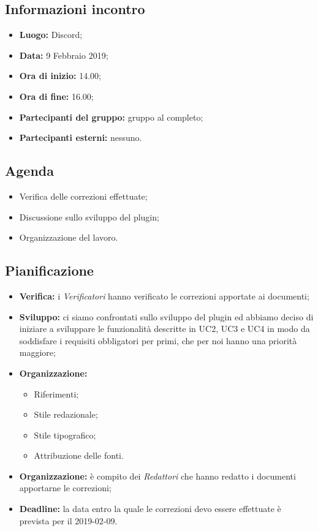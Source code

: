 \subsection{Informazioni incontro}
\begin{itemize}
	\item { \textbf{Luogo:} Discord};
	\item { \textbf{Data:} 9 Febbraio 2019};
	\item { \textbf{Ora di inizio:} 14.00};
	\item { \textbf{Ora di fine:} 16.00};
	\item { \textbf{Partecipanti del gruppo:} gruppo al completo};
	\item { \textbf{Partecipanti esterni:} nessuno}.
\end{itemize}


\subsection{Agenda}
\begin{itemize}
	\item {Verifica delle correzioni effettuate;}
	\item {Discussione sullo sviluppo del plugin;}
	\item {Organizzazione del lavoro.}
\end{itemize}

\subsection{Pianificazione}
\begin{itemize}
	\item { \textbf{Verifica:} i \emph{Verificatori} hanno verificato le correzioni apportate ai documenti;}
	\item { \textbf{Sviluppo:} ci siamo confrontati sullo sviluppo del plugin ed abbiamo deciso di iniziare a sviluppare le funzionalità descritte in UC2, UC3 e UC4 in modo da soddisfare i requisiti obbligatori per primi, che per noi hanno una priorità maggiore;}
	\item { \textbf{Organizzazione:}
		\begin{itemize}
			\item Riferimenti;
			\item Stile redazionale;
			\item Stile tipografico;
			\item Attribuzione delle fonti.
		\end{itemize}
	}	
	\item { \textbf{Organizzazione:} è compito dei \emph{Redattori} che hanno redatto i documenti apportarne le correzioni;}	
	\item { \textbf{Deadline:} la data entro la quale le correzioni devo essere effettuate è prevista per il 2019-02-09.}
\end{itemize}

